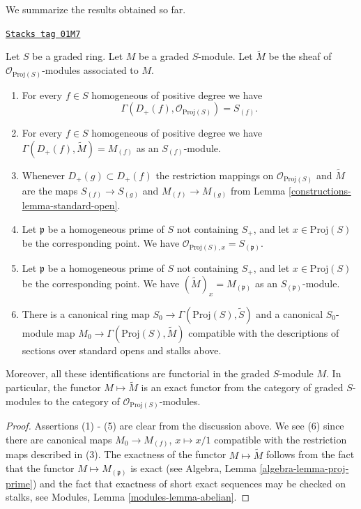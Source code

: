 We summarize the results obtained so far.

\begin{lemma}
\label{constructions-lemma-proj-sheaves}
\href{https://stacks.math.columbia.edu/tag/01M7}{\texttt{Stacks tag 01M7}}

Let $S$ be a graded ring. Let $M$ be a graded $S$-module.
Let $\widetilde M$ be the sheaf of $\mathcal{O}_{\text{Proj}(S)}$-modules
associated to $M$.
\begin{enumerate}
\item For every $f \in S$ homogeneous of positive degree we have
$$
\Gamma(D_{+}(f), \mathcal{O}_{\text{Proj}(S)}) = S_{(f)}.
$$
\item For every $f\in S$ homogeneous of positive degree
we have $\Gamma(D_{+}(f), \widetilde M) = M_{(f)}$
as an $S_{(f)}$-module.
\item Whenever $D_{+}(g) \subset D_{+}(f)$ the restriction mappings
on $\mathcal{O}_{\text{Proj}(S)}$ and $\widetilde M$
are the maps
$S_{(f)} \to S_{(g)}$ and $M_{(f)} \to M_{(g)}$ from Lemma
\ref{constructions-lemma-standard-open}.
\item Let $\mathfrak p$ be a homogeneous prime of $S$ not containing
$S_{+}$, and let $x \in \text{Proj}(S)$
be the corresponding point. We have
$\mathcal{O}_{\text{Proj}(S), x} = S_{(\mathfrak p)}$.
\item Let $\mathfrak p$ be a homogeneous prime of $S$ not containing
$S_{+}$, and let $x \in \text{Proj}(S)$
be the corresponding point. We have $(\widetilde M)_x = M_{(\mathfrak p)}$
as an $S_{(\mathfrak p)}$-module.
\item
\label{constructions-item-map}
There is a canonical ring map
$
S_0 \longrightarrow \Gamma(\text{Proj}(S), \widetilde S)
$
and a canonical $S_0$-module map
$
M_0 \longrightarrow \Gamma(\text{Proj}(S), \widetilde M)
$
compatible with the descriptions of sections over standard opens
and stalks above.
\end{enumerate}
Moreover, all these identifications are functorial in the graded
$S$-module $M$. In particular, the functor $M \mapsto \widetilde M$
is an exact functor from the category of graded $S$-modules
to the category of $\mathcal{O}_{\text{Proj}(S)}$-modules.
\end{lemma}

\begin{proof}
Assertions (1) - (5) are clear from the discussion above.
We see (6) since there are canonical maps $M_0 \to M_{(f)}$,
$x \mapsto x/1$ compatible with the restriction maps
described in (3). The exactness of the functor $M \mapsto \widetilde M$
follows from the fact that the functor $M \mapsto M_{(\mathfrak p)}$
is exact (see Algebra, Lemma \ref{algebra-lemma-proj-prime})
and the fact that exactness of short exact sequences
may be checked on stalks, see
Modules, Lemma \ref{modules-lemma-abelian}.
\end{proof}


